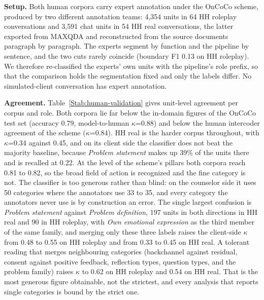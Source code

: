 \documentclass[fleqn,10pt]{JLA_article}
\begin{document}
\textbf{Setup.} Both human corpora carry expert annotation under the OnCoCo scheme, produced by two different annotation teams: 4{,}354 units in 64 HH roleplay conversations and 3{,}591 chat units in 54 HH real conversations, the latter exported from MAXQDA and reconstructed from the source documents paragraph by paragraph. The experts segment by function and the pipeline by sentence, and the two cuts rarely coincide (boundary F1 0.13 on HH roleplay). We therefore re-classified the experts' own units with the pipeline's role prefix, so that the comparison holds the segmentation fixed and only the labels differ. No simulated-client conversation has expert annotation.

\textbf{Agreement.} Table~\ref{Stab:human-validation} gives unit-level agreement per corpus and role. Both corpora lie far below the in-domain figures of the OnCoCo test set (accuracy 0.79, model-to-human $\kappa$=0.88) and below the human intercoder agreement of the scheme ($\kappa$=0.84). HH real is the harder corpus throughout, with $\kappa$=0.34 against 0.45, and on its client side the classifier does not beat the majority baseline, because \emph{Problem statement} makes up 39\% of the units there and is recalled at 0.22. At the level of the scheme's pillars both corpora reach 0.81 to 0.82, so the broad field of action is recognized and the fine category is not. The classifier is too generous rather than blind: on the counselor side it uses 50 categories where the annotators use 33 to 35, and every category the annotators never use is by construction an error. The single largest confusion is \emph{Problem statement} against \emph{Problem definition}, 197 units in both directions in HH real and 90 in HH roleplay, with \emph{Own emotional expression} as the third member of the same family, and merging only these three labels raises the client-side $\kappa$ from 0.48 to 0.55 on HH roleplay and from 0.33 to 0.45 on HH real. A tolerant reading that merges neighbouring categories (backchannel against residual, consent against positive feedback, reflection types, question types, and the problem family) raises $\kappa$ to 0.62 on HH roleplay and 0.54 on HH real. That is the most generous figure obtainable, not the strictest, and every analysis that reports single categories is bound by the strict one.
\end{document}
